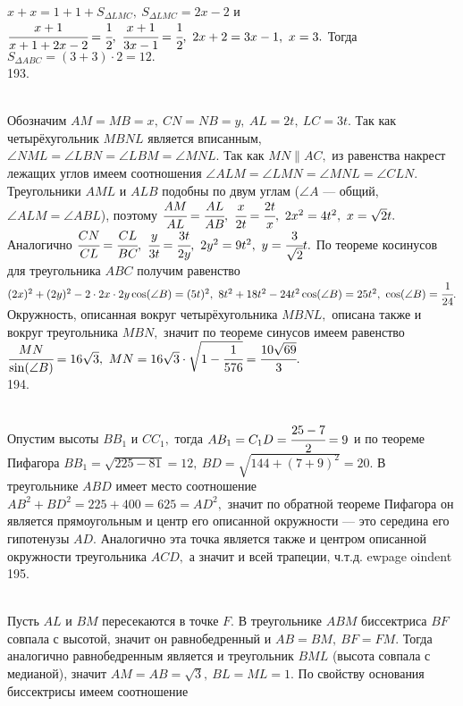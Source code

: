 $x+x=1+1+S_{\Delta LMC},\ S_{\Delta LMC}=2x-2$ и $\cfrac{x+1}{x+1+2x-2}=\cfrac{1}{2},\ \cfrac{x+1}{3x-1}=\cfrac{1}{2},\ 2x+2=3x-1,\ x=3.$ Тогда $S_{\Delta ABC}=(3+3)\cdot2=12.$\\
193. \begin{figure}[ht!]
\end{figure}\\
Обозначим $AM=MB=x,\ CN=NB=y,\ AL=2t,\ LC=3t.$ Так как четырёхугольник $MBNL$ является вписанным, $\angle NML=\angle LBN=\angle LBM=\angle MNL.$ Так как $MN\parallel AC,$ из равенства накрест лежащих углов имеем соотношения $\angle ALM=\angle LMN=\angle MNL=\angle CLN.$ Треугольники $AML$ и $ALB$ подобны по двум углам ($\angle A$ --- общий, $\angle ALM=\angle ABL$), поэтому $\cfrac{AM}{AL}=\cfrac{AL}{AB},\ \cfrac{x}{2t}=\cfrac{2t}{x},\ 2x^2=4t^2,\ x=\sqrt{2}t.$ Аналогично $\cfrac{CN}{CL}=\cfrac{CL}{BC},\ \cfrac{y}{3t}=\cfrac{3t}{2y},\ 2y^2=9t^2,\ y=\cfrac{3}{\sqrt{2}}t.$ По теореме косинусов для треугольника $ABC$ получим равенство $(2x)^2+(2y)^2-2\cdot2x\cdot2y\cos(\angle B)=(5t)^2,\
8t^2+18t^2-24t^2\cos(\angle B)=25t^2,\ \cos(\angle B)=\cfrac{1}{24}.$ Окружность, описанная вокруг четырёхугольника $MBNL,$ описана также и вокруг треугольника $MBN,$ значит по теореме синусов имеем равенство $\cfrac{MN}{\sin(\angle B)}=16\sqrt{3},\ MN=16\sqrt{3}\cdot\sqrt{1-\cfrac{1}{576}}=\cfrac{10\sqrt{69}}{3}.$\\
194. \begin{figure}[ht!]
\end{figure}\\
Опустим высоты $BB_1$ и $CC_1,$ тогда $AB_1=C_1D=\cfrac{25-7}{2}=9$ и по теореме Пифагора $BB_1=\sqrt{225-81}=12,\ BD=\sqrt{144+(7+9)^2}=20.$ В треугольнике $ABD$ имеет место соотношение $AB^2+BD^2=225+400=625=AD^2,$ значит по обратной теореме Пифагора он является прямоугольным и центр его описанной окружности --- это середина его гипотенузы $AD.$ Аналогично эта точка является также и центром описанной окружности треугольника $ACD,$ а значит и всей трапеции, ч.т.д.
ewpage
oindent
195. \begin{figure}[ht!]
\end{figure}\\
Пусть $AL$ и $BM$ пересекаются в точке $F.$ В треугольнике $ABM$ биссектриса $BF$ совпала с высотой, значит он равнобедренный и $AB=BM,\ BF=FM.$ Тогда аналогично равнобедренным является и треугольник $BML$ (высота совпала с медианой), значит $AM=AB=\sqrt{3},\ BL=ML=1.$ По свойству основания биссектрисы имеем соотношение

